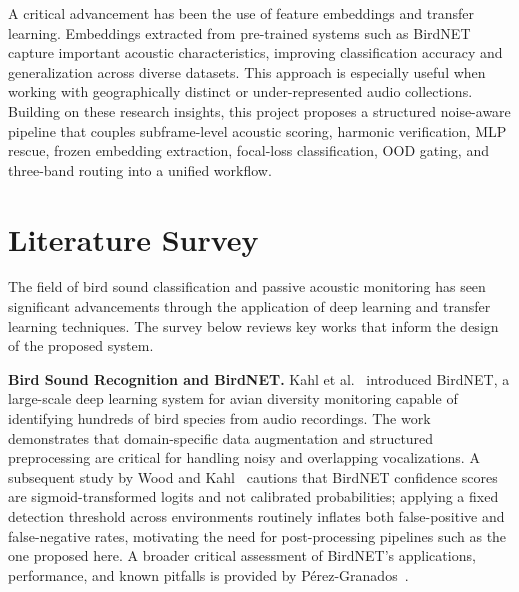 \documentclass[a4paper,12pt]{article}
\begin{document}
\vspace{0.3cm}

\noindent
A critical advancement has been the use of feature embeddings and transfer learning. Embeddings
extracted from pre-trained systems such as BirdNET~\cite{BirdNET} capture important acoustic
characteristics, improving classification accuracy and generalization across diverse datasets.
This approach is especially useful when working with geographically distinct or under-represented
audio collections. Building on these research insights, this project proposes a structured
noise-aware pipeline that couples subframe-level acoustic scoring, harmonic verification, MLP
rescue, frozen embedding extraction, focal-loss classification, OOD gating, and three-band routing
into a unified workflow.

\newpage
\section{Literature Survey}

\noindent
The field of bird sound classification and passive acoustic monitoring has seen significant
advancements through the application of deep learning and transfer learning techniques.
The survey below reviews key works that inform the design of the proposed system.

\vspace{0.3cm}

\noindent
\textbf{Bird Sound Recognition and BirdNET.}
Kahl et al.\ \cite{BirdNET} introduced BirdNET, a large-scale deep learning system for avian
diversity monitoring capable of identifying hundreds of bird species from audio recordings. The
work demonstrates that domain-specific data augmentation and structured preprocessing are critical
for handling noisy and overlapping vocalizations. A subsequent study by Wood and Kahl~\cite{WoodKahl}
cautions that BirdNET confidence scores are sigmoid-transformed logits and not calibrated
probabilities; applying a fixed detection threshold across environments routinely inflates both
false-positive and false-negative rates, motivating the need for post-processing pipelines such
as the one proposed here. A broader critical assessment of BirdNET's applications, performance,
and known pitfalls is provided by P\'{e}rez-Granados~\cite{PerezGranados}.

\vspace{0.3cm}
\end{document}
